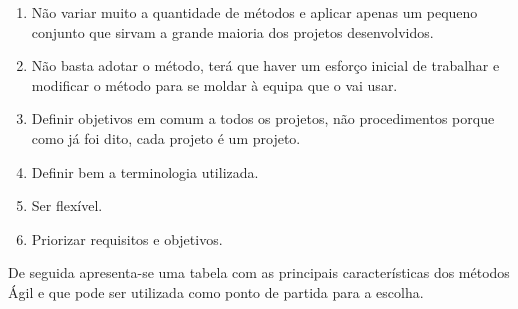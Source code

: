 \begin{enumerate}
    \item Não variar muito a quantidade de métodos e aplicar apenas um pequeno conjunto que sirvam a grande maioria dos projetos desenvolvidos.
    \item Não basta adotar o método, terá que haver um esforço inicial de trabalhar e modificar o método para se moldar à equipa que o vai usar.
    \item Definir objetivos em comum a todos os projetos, não procedimentos porque como já foi dito, cada projeto é um projeto.
    \item Definir bem a terminologia utilizada.
    \item Ser flexível.
    \item Priorizar requisitos e objetivos.
\end{enumerate}

De seguida apresenta-se uma tabela com as principais características dos métodos Ágil e que pode ser utilizada como ponto de partida para a escolha.

